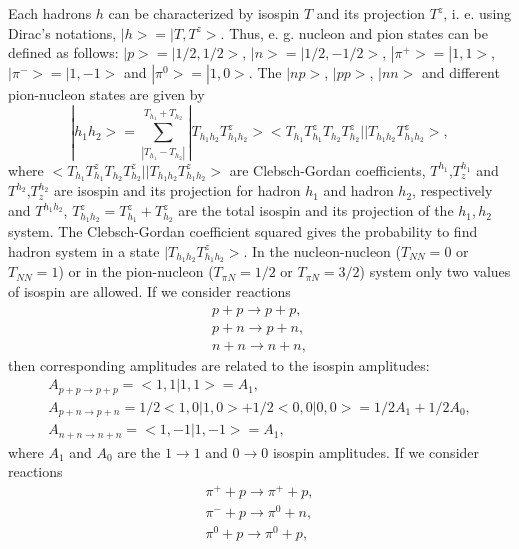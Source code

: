 Each hadrons $h$ can be characterized by isospin $T$ and its projection
$T^z$, i. e.  using Dirac's notations, $|h> = |T, T^z>$. Thus,
e. g. nucleon and pion states can be defined as follows: $|p> = |1/2,
1/2>$, $|n> = |1/2, -1/2>$, $|\pi^{+}> = |1, 1>$, $|\pi^{-}> = |1, -1>$
and $|\pi^{0}> = |1, 0>$.  The $|np>$, $|pp>$, $|nn>$ and different
pion-nucleon states are given by
\begin{equation}
\label{CCS1} |h_1h_2> = \sum_{|T_{h_1} - T_{h_2}|}^{T_{h_1} + T_{h_2}}|T_{h_1h_2}
T_{h_1h_2}^z>
<T_{h_1}T_{h_1}^{z}T_{h_2}T_{h_2}^{z}||T_{h_1h_2}T_{h_1h_2}^z>,
\end{equation}
where $<T_{h_1}T_{h_1}^{z}T_{h_2}T_{h_2}^{z}||T_{h_1h_2}T_{h_1h_2}^z> $
are Clebsch-Gordan coefficients, $T^{h_1}$,$T^{h_1}_z$ and
$T^{h_2}$,$T^{h_2}_z$ are isospin and its projection for hadron $h_1$
and hadron $h_2$, respectively and $T^{h_1h_2}$, $T_{h_1h_2}^z =
T_{h_1}^z + T_{h_2}^z$ are the total isospin and its projection of the
$h_1, h_2$ system.  The Clebsch-Gordan coefficient squared gives the
probability to find hadron system in a state $|T_{h_1h_2}T_{h_1h_2}^z>$.
In the nucleon-nucleon ($T_{NN} = 0$ or $T_{NN} = 1$) or in the
pion-nucleon ($T_{\pi N} = 1/2$ or $T_{\pi N} = 3/2$) system only two
values of isospin are allowed. If we consider reactions
\begin{equation}
\label{CCS2}
\begin{array}{ccc}
p + p \rightarrow p + p,\\
p + n \rightarrow p + n,\\
n + n \rightarrow n + n,
\end{array}
\end{equation}
then corresponding amplitudes are related to the isospin amplitudes:
\begin{equation}
\label{CCS3}
\begin{array}{ccc}
A_{p + p \rightarrow p + p} = <1, 1|1,1> =A_1,\\
A_{p + n \rightarrow p + n} =  1/2<1, 0|1,0>+1/2<0,0|0,0> = 
1/2A_1 + 1/2 A_0,\\
A_{n + n \rightarrow n + n}= <1,-1|1, -1> = A_1,
\end{array}
\end{equation}
where $A_1$ and $A_0$ are the $1\rightarrow 1$ and $0\rightarrow 0$ isospin 
amplitudes.
If we consider reactions
\begin{equation}
\label{CCS4}
\begin{array}{ccc}
\pi^{+} + p \rightarrow \pi^{+} + p,\\
\pi^{-} + p \rightarrow \pi^{0} + n,\\
\pi^{0} + p \rightarrow \pi^{0} + p,
\end{array}
\end{equation}
